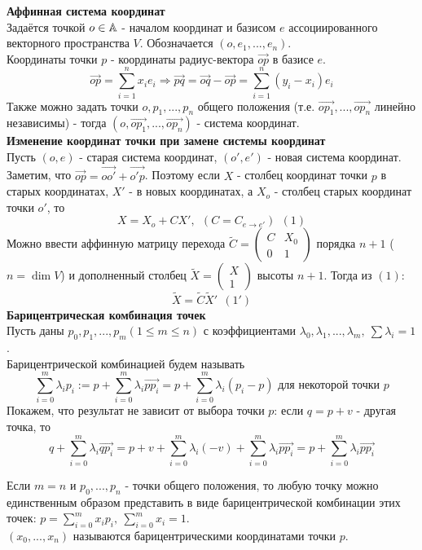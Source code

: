 \textbf{Аффинная система координат}\\
Задаётся точкой $o \in \mathbb{A}$ - началом координат и базисом $e$ ассоциированного векторного пространства $V$. Обозначается $(o, e_1,...,e_n)$.\\
Координаты точки $p$ - координаты радиус-вектора $\overrightarrow{op}$ в базисе $e$.
$$\overrightarrow{op} = \sum \limits_{i=1}^n x_ie_i \Longrightarrow \overrightarrow{pq} = \overrightarrow{oq} - \overrightarrow{op} = \sum \limits_{i=1}^n (y_i - x_i)e_i$$
Также можно задать точки $o, p_1,...,p_n$ общего положения (т.е. $\overrightarrow{op_1},...,\overrightarrow{op_n}$ линейно независимы) - тогда $(o, \overrightarrow{op_1},...,\overrightarrow{op_n})$ - система координат.\\
\textbf{Изменение координат точки при замене системы координат}\\
Пусть $(o, e)$ - старая система координат, $(o', e')$ - новая система координат.\\
Заметим, что $\overrightarrow{op} = \overrightarrow{oo'} + \overrightarrow{o'p}$. Поэтому если $X$ - столбец координат точки $p$ в старых координатах, $X'$ - в новых координатах, а $X_o$ - столбец старых координат точки $o'$, то $$X = X_o + CX', \ \ (C = C_{e\rightarrow e'}) \ \ (1)$$
Можно ввести аффинную матрицу перехода $\tilde{C} = \begin{pmatrix} C&X_0 \\ 0&1 \end{pmatrix}$ порядка $n + 1$ ($n = \dim V$) и дополненный столбец $\tilde{X} = \begin{pmatrix} X \\ 1 \end{pmatrix}$ высоты $n + 1$. Тогда из $(1)$:
$$\tilde{X} = \tilde{C}\tilde{X}' \ \ (1')$$
\textbf{Барицентрическая комбинация точек}\\
Пусть даны $p_0,p_1,...,p_m (1 \leqslant m \leqslant n)$ с коэффициентами $\lambda_0,\lambda_1,...,\lambda_m, \ \sum \lambda_i = 1$.\\
Барицентрической комбинацией будем называть 
$$\sum \limits_{i=0}^m \lambda_ip_i := p + \sum \limits_{i=0}^m \lambda_i \overrightarrow{pp_i} = p + \sum \limits_{i=0}^m \lambda_i(p_i - p)\text{ для некоторой точки } p$$
Покажем, что результат не зависит от выбора точки $p$: если $q = p + v$ - другая точка, то
$$q + \sum \limits_{i=0}^m \lambda_i \overrightarrow{qp_i} = p+ v + \sum \limits_{i=0}^m \lambda_i(-v) + \sum \limits_{i=0}^m \lambda_i \overrightarrow{pp_i} = p + \sum \limits_{i=0}^m \lambda_i \overrightarrow{pp_i}$$
\begin{consequense}
    Если $m = n$ и $p_0,...,p_n$ - точки общего положения, то любую точку можно единственным образом представить в виде барицентрической комбинации этих точек: $p = \sum \limits_{i=0}^m x_ip_i, \ \sum \limits_{i=0}^m x_i = 1$.\\
    $(x_0,...,x_n)$ называются барицентрическими координатами точки $p$.
\end{consequense}
